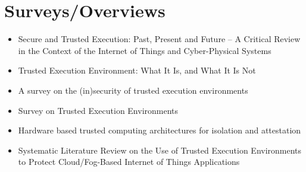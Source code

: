 \documentclass[10pt,a4paper]{article}
\begin{document}
\section{Surveys/Overviews}
\begin{itemize}
    \item Secure and Trusted Execution: Past, Present and Future – A Critical Review in the Context of the Internet of Things and Cyber-Physical Systems \cite{Shepherd2016}
    \item Trusted Execution Environment: What It Is, and What It Is Not \cite{tee_whatitis}
    \item A survey on the (in)security of trusted execution environments \cite{survey_insecuritys}
    \item Survey on Trusted Execution Environments \cite{Buchner2022}
    \item Hardware based trusted computing architectures for isolation and attestation \cite{Maene2018}
    \item Systematic Literature Review on the Use of Trusted Execution Environments to Protect Cloud/Fog-Based Internet of Things Applications \cite{Valadares2021}
\end{itemize}



\printbibliography
\end{document}
